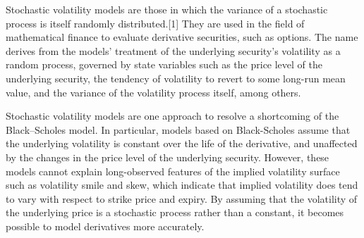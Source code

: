 Stochastic volatility models are those in which the variance of a stochastic process is itself randomly distributed.[1] They are used in the field of mathematical finance to evaluate derivative securities, such as options. The name derives from the models' treatment of the underlying security's volatility as a random process, governed by state variables such as the price level of the underlying security, the tendency of volatility to revert to some long-run mean value, and the variance of the volatility process itself, among others.

Stochastic volatility models are one approach to resolve a shortcoming of the Black–Scholes model. In particular, models based on Black-Scholes assume that the underlying volatility is constant over the life of the derivative, and unaffected by the changes in the price level of the underlying security. However, these models cannot explain long-observed features of the implied volatility surface such as volatility smile and skew, which indicate that implied volatility does tend to vary with respect to strike price and expiry. By assuming that the volatility of the underlying price is a stochastic process rather than a constant, it becomes possible to model derivatives more accurately.
